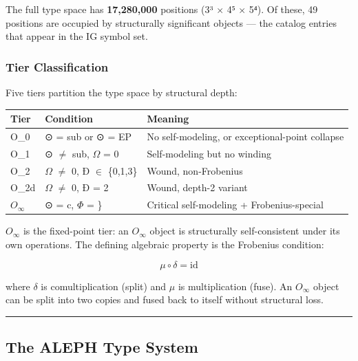 \documentclass[12pt,a4paper]{article}
\begin{document}
The full type space has \textbf{17,280,000} positions (3³ $\times$ 4⁵ $\times$ 5⁴). Of these, 49 positions are occupied by structurally significant objects --- the catalog entries that appear in the IG symbol set.

\subsubsection{Tier Classification}

Five tiers partition the type space by structural depth:

\begin{table}[htbp]
\centering
\small
{}
\begin{tabularx}{\textwidth}{>{\centering\arraybackslash}X >{\centering\arraybackslash}X >{\centering\arraybackslash}X}
\toprule
\rowcolor{gray!25}\textbf{Tier} & \textbf{Condition} & \textbf{Meaning} \\
\midrule
\rowcolors{1}{white}{gray!10}
O\_0 & ⊙ = sub or ⊙ = EP & No self-modeling, or exceptional-point collapse \\
O\_1 & ⊙ $\neq$ sub, $\Omega$ = 0 & Self-modeling but no winding \\
O\_2 & $\Omega$ $\neq$ 0, Ð $\in$ \{0,1,3\} & Wound, non-Frobenius \\
O\_2d & $\Omega$ $\neq$ 0, Ð = 2 & Wound, depth-2 variant \\
$O_{\infty}$ & ⊙ = c, $\Phi$ = \} & Critical self-modeling + Frobenius-special \\
\bottomrule
\end{tabularx}
\end{table}

$O_{\infty}$ is the fixed-point tier: an $O_{\infty}$ object is structurally self-consistent under its own operations. The defining algebraic property is the Frobenius condition:

\[\mu \circ \delta = \mathrm{id}\]

where $\delta$ is comultiplication (split) and $\mu$ is multiplication (fuse). An $O_{\infty}$ object can be split into two copies and fused back to itself without structural loss.

\begin{center}
\rule{0.5\textwidth}{0.4pt}
\end{center}

\subsection{The ALEPH Type System}
\end{document}
